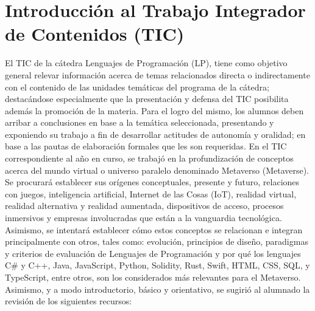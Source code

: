 \documentclass[a4paper,10pt]{article}
\begin{document}
	\section{Introducción al Trabajo Integrador de Contenidos (TIC)}
	El TIC de la cátedra Lenguajes de Programación (LP), tiene como objetivo general relevar información acerca de temas relacionados directa o indirectamente con el contenido de las unidades temáticas del programa de la cátedra; destacándose especialmente que la presentación y defensa del TIC posibilita además la promoción de la materia. Para el logro del mismo, los alumnos deben arribar a conclusiones en base a la temática seleccionada, presentando y exponiendo su trabajo a fin de desarrollar actitudes de autonomía y oralidad; en base a las pautas de elaboración formales que les son requeridas. En el TIC correspondiente al año en curso, se trabajó en la profundización de conceptos acerca del mundo virtual o universo paralelo denominado Metaverso (Metaverse). Se procurará establecer sus orígenes conceptuales, presente y futuro, relaciones con juegos, inteligencia artificial, Internet de las Cosas (IoT), realidad virtual, realidad alternativa y realidad aumentada, dispositivos de acceso, procesos inmersivos y empresas involucradas que están a la vanguardia tecnológica. Asimismo, se intentará establecer cómo estos conceptos se relacionan e integran principalmente con otros, tales como: evolución, principios de diseño, paradigmas y criterios de evaluación de Lenguajes de Programación y por qué los lenguajes C\# y C++, Java, JavaScript, Python, Solidity, Rust, Swift, HTML, CSS, SQL, y TypeScript, entre otros, son los considerados más relevantes para el Metaverso.
	Asimismo, y a modo introductorio, básico y orientativo, se sugirió al alumnado la revisión de los siguientes recursos: 
\end{document}

